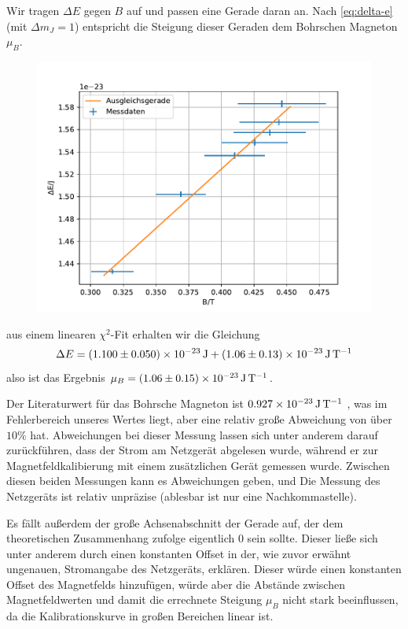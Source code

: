 \documentclass{article}
\begin{document}
\begin{multicols}{2}
Wir tragen $\Delta E$ gegen $B$ auf und passen eine Gerade daran an. Nach \eqref{eq:delta-e} (mit $\Delta m_J=1$)
entspricht die Steigung dieser Geraden dem Bohrschen Magneton $\mu_B$.



\begin{figure}[H]
  \centering
  \includegraphics[width=\linewidth]{energy_plot.pdf}
\end{figure}
aus einem linearen $\chi^2$-Fit erhalten wir die Gleichung
\[
  \Delta E = \SI{1.100\pm 0.050 e-23}{\J} + \SI{1.06\pm 0.13 e-23}{\J\per\T}
\]
also ist das Ergebnis $\mu_B = \SI{1.06\pm 0.15e-23}{\J\per\T}$.

Der Literaturwert für das Bohrsche Magneton ist $\SI{0.927e-23}{\J\per\T}$ \cite{bohr-magneton}, was im Fehlerbereich unseres Wertes liegt,
aber eine relativ große Abweichung von über $10\%$ hat.
Abweichungen bei dieser Messung lassen sich unter anderem darauf zurückführen, dass der Strom am Netzgerät abgelesen wurde,
während er zur Magnetfeldkalibierung mit einem zusätzlichen Gerät gemessen wurde. Zwischen diesen beiden Messungen kann
es Abweichungen geben, und Die Messung des Netzgeräts ist relativ unpräzise (ablesbar ist nur eine Nachkommastelle).

Es fällt außerdem der große Achsenabschnitt der Gerade auf, der dem theoretischen Zusammenhang zufolge eigentlich $0$
sein sollte. Dieser ließe sich unter anderem durch einen konstanten Offset in der, wie zuvor erwähnt ungenauen, Stromangabe des
Netzgeräts, erklären. Dieser würde einen konstanten Offset des Magnetfelds hinzufügen,
würde aber die Abstände zwischen Magnetfeldwerten und damit die errechnete Steigung $\mu_B$
nicht stark beeinflussen, da die Kalibrationskurve in großen Bereichen linear ist.



\end{multicols}
\end{document}
